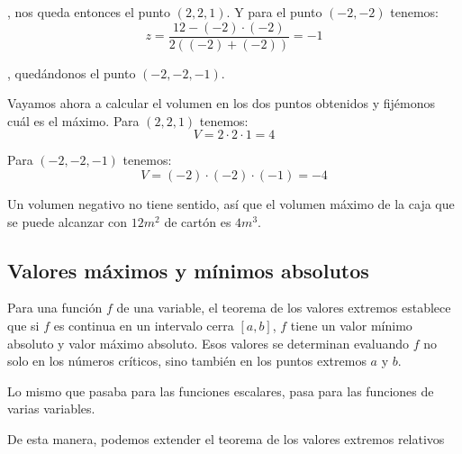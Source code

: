 \documentclass[12pt]{article}
\begin{document}
, nos queda entonces el punto $ (2,2,1) $. Y para el punto $ (-2,-2) $ tenemos:
\[
  z = \frac{12-(-2)\cdot (-2)}{2((-2)+(-2))} = -1
\]

, quedándonos el punto $ (-2,-2,-1) $. 

Vayamos ahora a calcular el volumen en los dos puntos obtenidos y fijémonos cuál es el máximo.
Para $ (2,2,1) $ tenemos:
\[
  V = 2\cdot 2\cdot 1 = 4
\]

Para $ (-2,-2,-1) $ tenemos:
\[
  V = (-2)\cdot (-2) \cdot (-1) = -4
\]

Un volumen negativo no tiene sentido, así que el volumen máximo de la caja que se puede alcanzar con $ 12m^2 $ de cartón es $ 4m^3 $.

\subsection{Valores máximos y mínimos absolutos}
Para una función $ f $ de una variable, el teorema de los valores extremos establece que si $ f $ es continua en un intervalo cerra $ \left[a,b\right] $, $ f $ tiene un valor mínimo absoluto y valor máximo absoluto. Esos valores se determinan evaluando $ f $ no solo en los números críticos, sino también en los puntos extremos $ a $ y $ b $. 

Lo mismo que pasaba para las funciones escalares, pasa para las funciones de varias variables.

\vspace{0.2cm}
\vspace{0.2cm}

De esta manera, podemos extender el teorema de los valores extremos relativos

\vspace{0.2cm}
\vspace{0.2cm}
\end{document}
